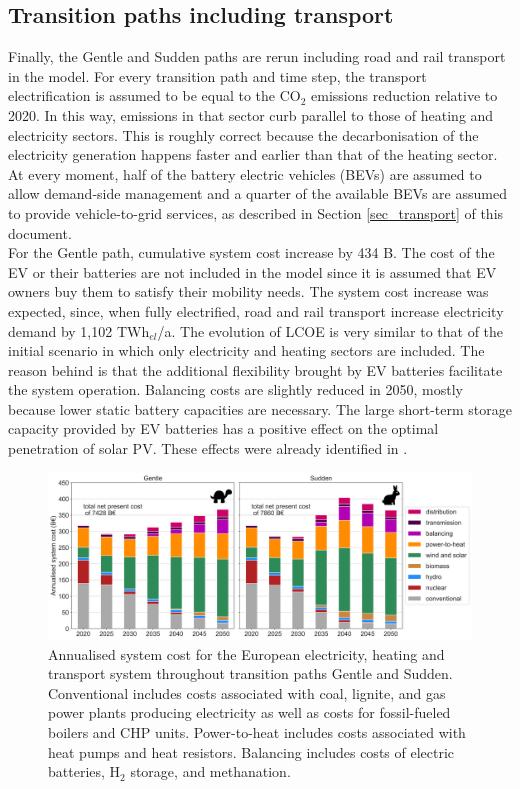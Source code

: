 \documentclass[3p]{elsarticle} %
\begin{document}
\FloatBarrier

\subsection{Transition paths including transport}
Finally, the Gentle and Sudden paths are rerun including road and rail transport in the model. For every transition path and time step, the transport electrification is assumed to be equal to the CO$_2$ emissions reduction relative to 2020. In this way, emissions in that sector curb parallel to those of heating and electricity sectors. This is roughly correct because the decarbonisation of the electricity generation happens faster and earlier than that of the heating sector.  
At every moment, half of the battery electric vehicles (BEVs) are assumed to allow demand-side management and a quarter of the available BEVs are assumed to provide vehicle-to-grid services, as described in Section \ref{sec_transport} of this document.\\

For the Gentle path, cumulative system cost increase by 434 B\EUR . The cost of the EV or their batteries are not included in the model since it is assumed that EV owners buy them to satisfy their mobility needs. The system cost increase was expected, since, when fully electrified, road and rail transport increase electricity demand by 1,102 TWh$_{el}$/a. The evolution of LCOE is very similar to that of the initial scenario in which only electricity and heating sectors are included. The reason behind is that the additional flexibility brought by EV batteries facilitate the system operation. Balancing costs are slightly reduced in 2050, mostly because lower static battery capacities are necessary. The large short-term storage capacity provided by EV batteries has a positive effect on the optimal penetration of solar PV. These effects were already identified in \cite{Brown_2018, Victoria_2019_storage}.

\begin{figure}[!h]
	\centering
	\includegraphics[width=\columnwidth]{../figures/System_cost_w_EV_exp.png}
	\caption{Annualised system cost for the European electricity, heating and transport system throughout transition paths Gentle and Sudden. Conventional includes costs associated with coal, lignite, and gas power plants producing electricity as well as costs for fossil-fueled boilers and CHP units. Power-to-heat includes costs associated with heat pumps and heat resistors. Balancing includes costs of electric batteries, H$_2$ storage, and methanation.} 
\end{figure}
\end{document}
